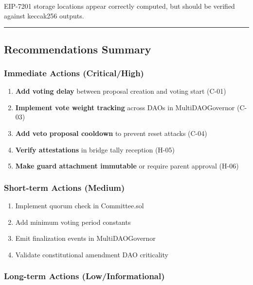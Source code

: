 \documentclass[
]{article}
\providecommand{\tightlist}{%
  \setlength{\itemsep}{0pt}\setlength{\parskip}{0pt}}
\begin{document}
EIP-7201 storage locations appear correctly computed, but should be
verified against keccak256 outputs.

\begin{center}\rule{0.5\linewidth}{0.5pt}\end{center}

\subsection{Recommendations Summary}\label{recommendations-summary}

\subsubsection{Immediate Actions
(Critical/High)}\label{immediate-actions-criticalhigh}

\begin{enumerate}
\def\labelenumi{\arabic{enumi}.}
\tightlist
\item
  \textbf{Add voting delay} between proposal creation and voting start
  (C-01)
\item
  \textbf{Implement vote weight tracking} across DAOs in
  MultiDAOGovernor (C-03)
\item
  \textbf{Add veto proposal cooldown} to prevent reset attacks (C-04)
\item
  \textbf{Verify attestations} in bridge tally reception (H-05)
\item
  \textbf{Make guard attachment immutable} or require parent approval
  (H-06)
\end{enumerate}

\subsubsection{Short-term Actions
(Medium)}\label{short-term-actions-medium}

\begin{enumerate}
\def\labelenumi{\arabic{enumi}.}
\setcounter{enumi}{5}
\tightlist
\item
  Implement quorum check in Committee.sol
\item
  Add minimum voting period constants
\item
  Emit finalization events in MultiDAOGovernor
\item
  Validate constitutional amendment DAO criticality
\end{enumerate}

\subsubsection{Long-term Actions
(Low/Informational)}\label{long-term-actions-lowinformational}
\end{document}
